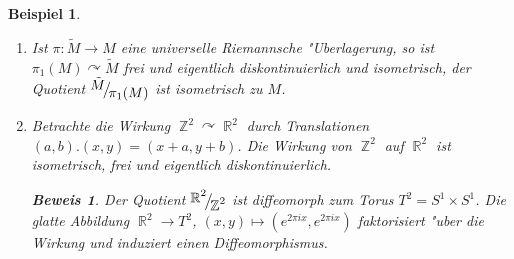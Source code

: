 \documentclass[paper=A4, twoside, chapterprefix=true, bibliography=totoc, headsepline]{scrbook}
\newcommand{\tikzgitter}[3][0.25]{
	\draw[step=#1,gray!15] #2 grid #3;
	\draw[step=2*#1,gray!30] #2 grid #3;
	\fill (0,0) circle(0.1); 
}
\DeclareMathOperator{\R}{\mathbb{R}}
\DeclareMathOperator{\Z}{\mathbb{Z}}
\newcommand{\X}{\times}
\newcommand{\FakRaum}[2]{
	\raisebox{0.7ex}{\ensuremath{#1}}
	\ensuremath{\mkern-3mu}\big/\ensuremath{\mkern-3mu}
	\raisebox{-0.6ex}{\ensuremath{#2}}}
\theoremstyle{plain}
\newtheorem{Bsp}[Dfn]{Beispiel}
\theoremstyle{nonumberplain}
\newtheorem{bew}{Beweis}
\theoremstyle{empty}
\theoremstyle{break}
\begin{document}
\begin{Bsp}
  \begin{enumerate}[label=(\arabic*),leftmargin=*]
  \item Ist $\pi: \tilde M \to M$ eine universelle Riemannsche "Uberlagerung, so ist $\pi_1(M) \curvearrowright \tilde M$ frei und eigentlich diskontinuierlich und isometrisch, der Quotient $\FakRaum{\tilde M}{\pi_1(M)}$ ist isometrisch zu $M$.
  \item Betrachte die Wirkung $\Z^2 \curvearrowright \R^2$ durch Translationen $(a,b).(x,y) = (x+a, y+b)$. Die Wirkung von $\Z^2$ auf $\R^2$ ist isometrisch, frei und eigentlich diskontinuierlich.
    \begin{bew}
      Der Quotient $\FakRaum{\R^2}{\Z^2}$ ist diffeomorph zum Torus $T^2 = S^1 \X S^1$.
      Die glatte Abbildung $\R^2 \to T^2$, $(x,y) \mapsto (e^{2 \pi i x}, e^{2 \pi i x})$ faktorisiert "uber die Wirkung und induziert einen Diffeomorphismus.
      \begin{center}
\end{center}
\end{bew}
\end{enumerate}
\end{Bsp}
\end{document}
